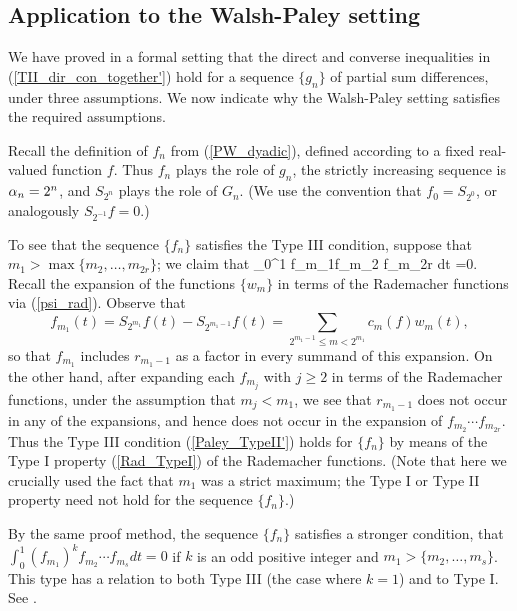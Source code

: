 \documentclass[oneside,11pt]{amsart}
\begin{document}
 


 \subsection{Application to the Walsh-Paley setting}
 We have proved in a formal setting that the direct and converse inequalities in (\ref{TII_dir_con_together'}) hold for a sequence $\{g_n\}$ of partial sum differences, under three assumptions. 
We now indicate why the Walsh-Paley setting satisfies the required assumptions.   

Recall the definition of $f_n$ from (\ref{PW_dyadic}), defined according to a fixed real-valued function $f$. Thus $f_n$ plays the role of $g_n$, the strictly increasing sequence is $\alpha_n=2^n$, and $S_{2^n}$ plays the role of $G_n$. (We use the convention that $f_0= S_{2^0}$, or analogously $S_{2^{-1}}f=0$.)

  To see that the sequence $\{ f_n\}$  satisfies   the Type III condition,
  suppose that $m_1 > \max \{m_2,\ldots, m_{2r}\}$; we claim that
\beq\label{Paley_TypeII'}
 \int_0^1 f_{m_1}f_{m_2} \cdots f_{m_{2r}} dt =0.
 \eeq
Recall the expansion of the functions $\{w_m\}$ in terms of   the Rademacher functions via (\ref{psi_rad}).
Observe that 
\[f_{m_1} (t) =  S_{2^{m_1}}f (t)- S_{2^{m_1-1}}f (t) =  \sum_{2^{m_1-1} \leq m < 2^{m_1}} c_m(f)w_m(t),\]
 so that $f_{m_1}$ includes $r_{m_1-1}$ as a factor in every summand of this expansion. On the other hand,
after expanding each $f_{m_j}$ with $j \geq 2$ in terms of the Rademacher functions, under the assumption that $m_j < m_1$, we see that $r_{m_1-1}$ does not occur in any of the expansions, and hence does not occur in the expansion of $f_{m_2} \cdots f_{m_{2r}}$. 
Thus the Type III condition (\ref{Paley_TypeII'})  holds for $\{f_n\}$ by means of the Type I property (\ref{Rad_TypeI}) of the Rademacher functions.  (Note that here we crucially used the fact that $m_1$ was a strict maximum;   the Type I or Type II property need not hold for the sequence $\{f_n\}$.)

\begin{remark}
By the same proof method, the sequence $\{f_n\}$  satisfies a stronger condition, that 
$
 \int_0^1 (f_{m_1})^k f_{m_2} \cdots f_{m_{s}} dt =0
$
 if $k$ is an odd positive integer and $m_1 > \{m_2,\ldots, m_s\}$.
 This type has a relation to both Type III (the case where $k=1$) and to Type I.
 See \cite[Lemma 1.4]{Sjo69}.
\end{remark}
\end{document}
